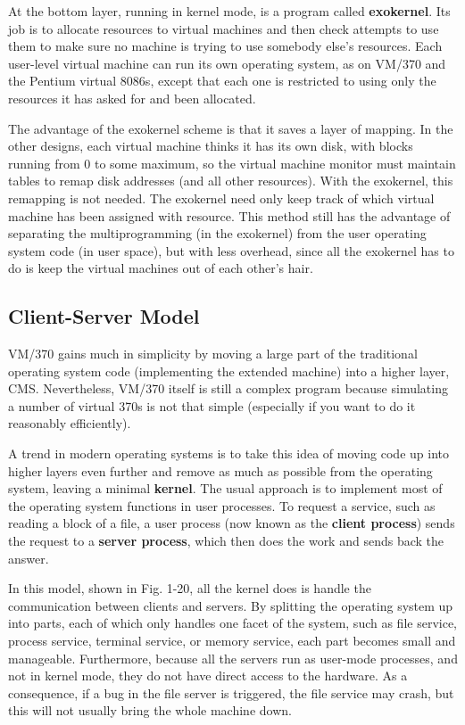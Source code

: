 \documentclass{book}
\newcommand {\kw}  [1] {\textbf{#1}}
\begin{document}
At the bottom layer, running in kernel mode, is a program called \kw{exokernel}.
Its job is to allocate resources to virtual machines and then check attempts to use them 
to make sure no machine is trying to use somebody else's resources.
Each user-level virtual machine can run its own operating system, as on VM/370 and the Pentium virtual 8086s,
except that each one is restricted to using only the resources it has asked for and been allocated.

The advantage of the exokernel scheme is that it saves a layer of mapping.
In the other designs, each virtual machine thinks it has its own disk, with blocks running from 0 to some maximum,
so the virtual machine monitor must maintain tables to remap disk addresses (and all other resources).
With the exokernel, this remapping is not needed.
The exokernel need only keep track of which virtual machine has been assigned with resource.
This method still has the advantage of separating the multiprogramming (in the exokernel) from 
the user operating system code (in user space), but with less overhead,
since all the exokernel has to do is keep the virtual machines out of each other's hair.
 
\subsection{Client-Server Model}
VM/370 gains much in simplicity by moving a large part of the traditional operating system code 
(implementing the extended machine) into a higher layer, CMS.
Nevertheless, VM/370 itself is still a complex program because simulating a number of virtual 370s is not that simple
(especially if you want to do it reasonably efficiently).

A trend in modern operating systems is to take this idea of moving code up into higher layers even further 
and remove as much as possible from the operating system, leaving a minimal \kw{kernel}.
The usual approach is to implement most of the operating system functions in user processes.
To request a service, such as reading a block of a file, 
a user process (now known as the \kw{client process}) sends the request to a \kw{server process},
which then does the work and sends back the answer.

In this model, shown in Fig. 1-20, all the kernel does is handle the communication between clients and servers.
By splitting the operating system up into parts, each of which only handles one facet of the system,
such as file service, process service, terminal service, or memory service, each part becomes small and manageable.
Furthermore, because all the servers run as user-mode processes, and not in kernel mode, 
they do not have direct access to the hardware.
As a consequence, if a bug in the file server is triggered, the file service may crash, 
but this will not usually bring the whole machine down.
\end{document}
